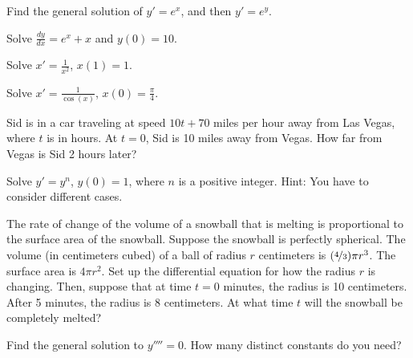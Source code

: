 \begin{exercise}
Find the general solution of
$y' = e^x$,  and then $y' = e^y$.
\end{exercise}


\setcounter{exercise}{100}

\begin{exercise}
Solve $\frac{dy}{dx} = e^x + x$ and $y(0) = 10$.
\end{exercise}

\begin{exercise}
Solve $x' = \frac{1}{x^2}$, $x(1)=1$.
\end{exercise}

\begin{exercise}
Solve $x' = \frac{1}{\cos(x)}$, $x(0)=\frac{\pi}{4}$.
\end{exercise}

\begin{exercise}
Sid is in a car traveling at speed $10t+70$ miles per hour away from Las Vegas,
where $t$ is in hours.  At $t=0$, Sid is 10 miles away from Vegas.  How
far from Vegas is Sid 2 hours later?
\end{exercise}

\begin{exercise}
Solve $y' = y^n$, $y(0) = 1$, where $n$ is a positive integer.
Hint: You have to consider different cases.
\end{exercise}

\begin{exercise}
The rate of change of the volume of a snowball that is melting is
proportional to the surface area of the snowball.  Suppose the
snowball is perfectly spherical.  The volume (in centimeters cubed)
of a ball of radius $r$ centimeters is
$(\nicefrac{4}{3}) \pi r^3$.  The surface area is
$4 \pi r^2$.  Set up the differential equation for how the radius $r$ is changing.
Then, suppose that at time $t=0$ minutes, the radius is 10 centimeters.
After 5 minutes, the radius is 8 centimeters.  At what time $t$ will the
snowball be completely melted?
\end{exercise}

\begin{exercise}
Find the general solution to $y''''= 0$.  How many distinct constants do you need?
\end{exercise}

